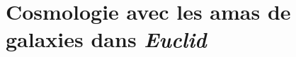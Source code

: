 \documentclass[a4paper, 12pt]{report}
\begin{document}
%
%
\chapter{Cosmologie avec les amas de galaxies dans \emph{Euclid}}
\label{se:cosmo_euclid}




%


\end{document}

